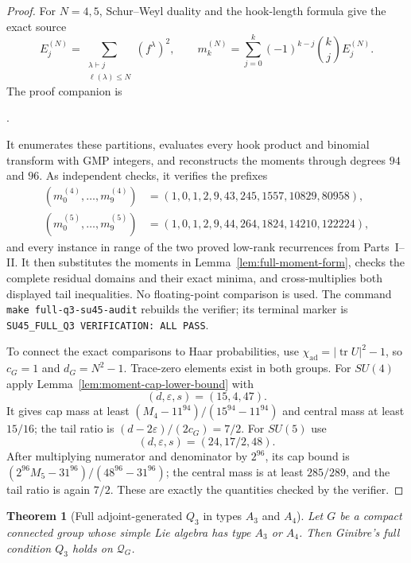 \documentclass[11pt,reqno]{amsart}
\theoremstyle{plain}
\newtheorem{theorem}{Theorem}[section]
\theoremstyle{definition}
\newcommand{\chiad}{\chi_{\mathrm{ad}}}
\newcommand{\Qcone}{\mathcal Q}
\begin{document}
\begin{proof}
For $N=4,5$, Schur--Weyl duality and the hook-length formula give the exact
source
\[
 E_j^{(N)}=
 \sum_{\substack{\lambda\vdash j\\\ell(\lambda)\leq N}}(f^\lambda)^2,
 \qquad
 m_k^{(N)}=\sum_{j=0}^k(-1)^{k-j}\binom kjE_j^{(N)}.
\]
The proof companion is
\begin{center}
.
\end{center}
It enumerates these partitions, evaluates every hook product and binomial
transform with GMP integers, and reconstructs the moments through degrees
$94$ and $96$.  As independent checks, it verifies the prefixes
\[
 \begin{aligned}
 (m_0^{(4)},\ldots,m_9^{(4)})
   &=(1,0,1,2,9,43,245,1557,10829,80958),\\
 (m_0^{(5)},\ldots,m_9^{(5)})
   &=(1,0,1,2,9,44,264,1824,14210,122224),
 \end{aligned}
\]
and every instance in range of the two proved low-rank recurrences from
Parts~I--II.  It then substitutes the moments in
Lemma~\ref{lem:full-moment-form}, checks the complete residual domains and
their exact minima, and cross-multiplies both displayed tail inequalities.
No floating-point comparison is used.  The command
\texttt{make full-q3-su45-audit} rebuilds the verifier; its terminal marker is
\texttt{SU45\_FULL\_Q3 VERIFICATION: ALL PASS}.

To connect the exact comparisons to Haar probabilities, use
$\chiad=|\operatorname{tr}U|^2-1$, so $c_G=1$ and
$d_G=N^2-1$.  Trace-zero elements exist in both groups.  For $SU(4)$ apply
Lemma~\ref{lem:moment-cap-lower-bound} with
\[
 (d,\varepsilon,s)=(15,4,47).
\]
It gives cap mass at least $(M_4-11^{94})/(15^{94}-11^{94})$ and central
mass at least $15/16$; the tail ratio is
$(d-2\varepsilon)/(2c_G)=7/2$.  For $SU(5)$ use
\[
 (d,\varepsilon,s)=(24,17/2,48).
\]
After multiplying numerator and denominator by $2^{96}$, its cap bound is
$(2^{96}M_5-31^{96})/(48^{96}-31^{96})$; the central mass is at least
$285/289$, and the tail ratio is again $7/2$.  These are exactly the
quantities checked by the verifier.
\end{proof}

\begin{theorem}[Full adjoint-generated $Q_3$ in types $A_3$ and $A_4$]
\label{thm:su45-full-cone}
Let $G$ be a compact connected group whose simple Lie algebra has type
$A_3$ or $A_4$.  Then Ginibre's full condition $Q_3$ holds on $\Qcone_G$.
\end{theorem}
\end{document}

